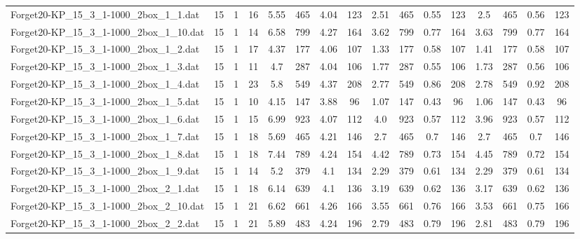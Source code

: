 \begin{sidewaystable}[!ht]
{\begin{tabular}{lccccccccccccccc}
Forget20-KP\_15\_3\_1-1000\_2box\_1\_1.dat & 15 & 1 & 16 & 5.55 & 465 & 4.04 & 123 & 2.51 & 465 &  \textcolor{blue2}{0.55} & 123 & 2.5 & 465 & 0.56 & 123 \\
Forget20-KP\_15\_3\_1-1000\_2box\_1\_10.dat & 15 & 1 & 14 & 6.58 & 799 & 4.27 & 164 & 3.62 & 799 & 0.77 & 164 & 3.63 & 799 & 0.77 & 164 \\
Forget20-KP\_15\_3\_1-1000\_2box\_1\_2.dat & 15 & 1 & 17 & 4.37 & 177 & 4.06 & 107 & 1.33 & 177 &  \textcolor{blue2}{0.58} & 107 & 1.41 & 177 &  \textcolor{blue2}{0.58} & 107 \\
Forget20-KP\_15\_3\_1-1000\_2box\_1\_3.dat & 15 & 1 & 11 & 4.7 & 287 & 4.04 & 106 & 1.77 & 287 &  \textcolor{blue2}{0.55} & 106 & 1.73 & 287 & 0.56 & 106 \\
Forget20-KP\_15\_3\_1-1000\_2box\_1\_4.dat & 15 & 1 & 23 & 5.8 & 549 & 4.37 & 208 & 2.77 & 549 &  \textcolor{blue2}{0.86} & 208 & 2.78 & 549 & 0.92 & 208 \\
Forget20-KP\_15\_3\_1-1000\_2box\_1\_5.dat & 15 & 1 & 10 & 4.15 & 147 & 3.88 & 96 & 1.07 & 147 & 0.43 & 96 & 1.06 & 147 & 0.43 & 96 \\
Forget20-KP\_15\_3\_1-1000\_2box\_1\_6.dat & 15 & 1 & 15 & 6.99 & 923 & 4.07 & 112 & 4.0 & 923 &  \textcolor{blue2}{0.57} & 112 & 3.96 & 923 &  \textcolor{blue2}{0.57} & 112 \\
Forget20-KP\_15\_3\_1-1000\_2box\_1\_7.dat & 15 & 1 & 18 & 5.69 & 465 & 4.21 & 146 & 2.7 & 465 &  \textcolor{blue2}{0.7} & 146 & 2.7 & 465 &  \textcolor{blue2}{0.7} & 146 \\
Forget20-KP\_15\_3\_1-1000\_2box\_1\_8.dat & 15 & 1 & 18 & 7.44 & 789 & 4.24 & 154 & 4.42 & 789 & 0.73 & 154 & 4.45 & 789 &  \textcolor{blue2}{0.72} & 154 \\
Forget20-KP\_15\_3\_1-1000\_2box\_1\_9.dat & 15 & 1 & 14 & 5.2 & 379 & 4.1 & 134 & 2.29 & 379 &  \textcolor{blue2}{0.61} & 134 & 2.29 & 379 &  \textcolor{blue2}{0.61} & 134 \\
Forget20-KP\_15\_3\_1-1000\_2box\_2\_1.dat & 15 & 1 & 18 & 6.14 & 639 & 4.1 & 136 & 3.19 & 639 &  \textcolor{blue2}{0.62} & 136 & 3.17 & 639 &  \textcolor{blue2}{0.62} & 136 \\
Forget20-KP\_15\_3\_1-1000\_2box\_2\_10.dat & 15 & 1 & 21 & 6.62 & 661 & 4.26 & 166 & 3.55 & 661 & 0.76 & 166 & 3.53 & 661 &  \textcolor{blue2}{0.75} & 166 \\
Forget20-KP\_15\_3\_1-1000\_2box\_2\_2.dat & 15 & 1 & 21 & 5.89 & 483 & 4.24 & 196 & 2.79 & 483 &  \textcolor{blue2}{0.79} & 196 & 2.81 & 483 &  \textcolor{blue2}{0.79} & 196 \\

\end{tabular}}
\end{sidewaystable}
